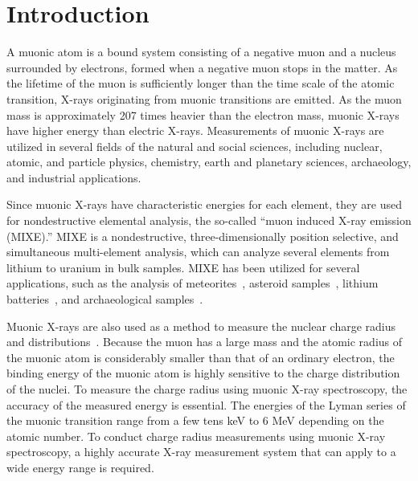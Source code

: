 \section{Introduction}

A muonic atom is a bound system consisting of a negative muon and a nucleus surrounded by electrons, formed %
when a negative muon stops in the matter. 
As the lifetime of the muon is sufficiently longer than the time scale of the atomic transition, X-rays originating from muonic transitions are emitted. 
As the muon mass is approximately 207 times heavier than the electron mass, muonic X-rays have higher energy than electric X-rays. 
Measurements of muonic X-rays are utilized in several fields of the natural and social sciences, including nuclear, atomic, and particle physics, chemistry, earth and planetary sciences, archaeology, and industrial applications.


Since muonic X-rays have characteristic energies for each element, they are used for nondestructive elemental analysis, the so-called ``muon induced X-ray emission (MIXE).'' 
MIXE is a nondestructive, three-dimensionally position selective, and simultaneous multi-element analysis, which can analyze several elements from lithium to uranium in bulk samples. %
MIXE has been utilized for several applications, such as the analysis of meteorites~\cite{Terada2014-cw, Terada2017-kb, Hofmann2023-kz, Chiu2023-mg}, asteroid samples~\cite{Nakamura2023-ge, Ninomiya2023}, lithium batteries~\cite{Umegaki2020-xi}, and archaeological samples~\cite{Ninomiya2015-jh, Hampshire2019-tc, Shimada-Takaura2021-ae, Biswas2023-xz}. 



Muonic X-rays are also used as a method to measure the nuclear charge radius and distributions~\cite{Fitch1953-et, Fricke1995-cm, Angeli2013-to, Saito2022-wl, Antognini2020-zf}. 
Because the muon has a large mass and the atomic radius of the muonic atom is considerably smaller than that of an ordinary electron, the binding energy of the muonic atom is highly sensitive to the charge distribution of the nuclei. 
To measure the charge radius using muonic X-ray spectroscopy, the accuracy of the measured energy is essential.
The energies of the Lyman series of the muonic transition range from a few tens keV to 6 MeV depending on the atomic number.
To conduct charge radius measurements using muonic X-ray spectroscopy, a highly accurate X-ray measurement system that can apply to a wide energy range is required. 

